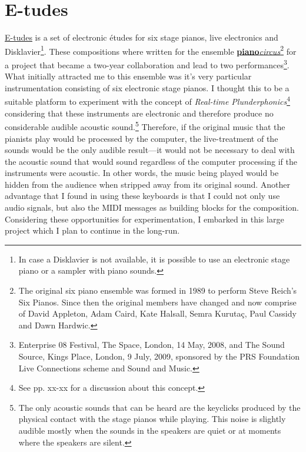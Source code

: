 \chapter{E-tudes}

\href{http://www.ranchonotorious.org/freuben/e-tudes}{E-tudes} is a set of electronic \'{e}tudes for six stage pianos, live electronics and Disklavier\footnote{In case a Disklavier is not available, it is possible to use an electronic stage piano or a sampler with piano sounds.}. These compositions where written for the ensemble \href{http://www.pianocircus.com/}{\textbf{piano}\emph{circus}}\footnote{The original six piano ensemble was formed in 1989 to perform Steve Reich's Six Pianos. Since then the original members have changed and now comprise of David Appleton, Adam Caird, Kate Halsall, Semra Kurutaç, Paul Cassidy and Dawn Hardwic.} for a project that became a two-year collaboration and lead to two performances\footnote{Enterprise 08 Festival, The Space, London, 14 May, 2008, and The Sound Source, Kings Place, London, 9 July, 2009, sponsored by the PRS Foundation Live Connections scheme and Sound and Music.}. What initially attracted me to this ensemble was it's very particular instrumentation consisting of six electronic stage pianos. I thought this to be a suitable platform to experiment with the concept of \emph{Real-time Plunderphonics}\footnote{See pp. xx-xx for a discussion about this concept.} considering that these instruments are electronic and therefore produce no considerable audible acoustic sound.\footnote{The only acoustic sounds that can be heard are the keyclicks produced by the physical contact with the stage pianos while playing. This noise is slightly audible mostly when the sounds in the speakers are quiet or at moments where the speakers are silent.} Therefore, if the original music that the pianists play would be processed by the computer, the live-treatment of the sounds would be the only audible result---it would not be necessary to deal with the acoustic sound that would sound regardless of the computer processing if the instruments were acoustic. In other words, the music being played would be hidden from the audience when stripped away from its original sound. Another advantage that I found in using these keyboards is that I could not only use audio signals, but also the MIDI messages as building blocks for the composition. Considering these opportunities for experimentation, I embarked in this large project which I plan to continue in the long-run. 

